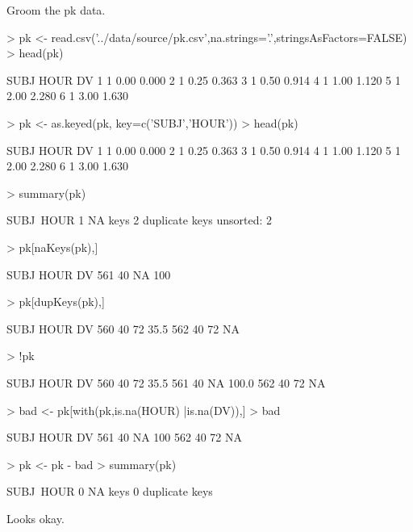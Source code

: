 Groom the pk data.
\begin{Schunk}
\begin{Sinput}
> pk   <- read.csv('../data/source/pk.csv',na.strings='.',stringsAsFactors=FALSE)
> head(pk)
\end{Sinput}
\begin{Soutput}
  SUBJ HOUR    DV
1    1 0.00 0.000
2    1 0.25 0.363
3    1 0.50 0.914
4    1 1.00 1.120
5    1 2.00 2.280
6    1 3.00 1.630
\end{Soutput}
\begin{Sinput}
> pk <- as.keyed(pk, key=c('SUBJ','HOUR'))
> head(pk)
\end{Sinput}
\begin{Soutput}
  SUBJ HOUR    DV
1    1 0.00 0.000
2    1 0.25 0.363
3    1 0.50 0.914
4    1 1.00 1.120
5    1 2.00 2.280
6    1 3.00 1.630
\end{Soutput}
\begin{Sinput}
> summary(pk)
\end{Sinput}
\begin{Soutput}
SUBJ~HOUR
1 NA keys
2 duplicate keys
unsorted: 2
\end{Soutput}
\begin{Sinput}
> pk[naKeys(pk),]
\end{Sinput}
\begin{Soutput}
    SUBJ HOUR  DV
561   40   NA 100
\end{Soutput}
\begin{Sinput}
> pk[dupKeys(pk),]
\end{Sinput}
\begin{Soutput}
    SUBJ HOUR   DV
560   40   72 35.5
562   40   72   NA
\end{Soutput}
\begin{Sinput}
> !pk
\end{Sinput}
\begin{Soutput}
    SUBJ HOUR    DV
560   40   72  35.5
561   40   NA 100.0
562   40   72    NA
\end{Soutput}
\begin{Sinput}
> bad <- pk[with(pk,is.na(HOUR) |is.na(DV)),]
> bad
\end{Sinput}
\begin{Soutput}
    SUBJ HOUR  DV
561   40   NA 100
562   40   72  NA
\end{Soutput}
\begin{Sinput}
> pk <- pk - bad
> summary(pk)
\end{Sinput}
\begin{Soutput}
SUBJ~HOUR
0 NA keys
0 duplicate keys
\end{Soutput}
\end{Schunk}
Looks okay.  


